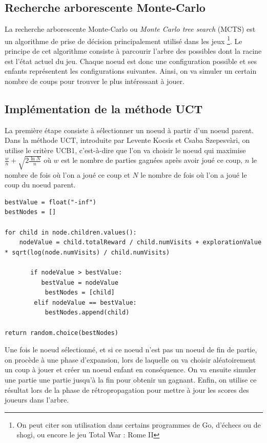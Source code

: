 \documentclass[a4paper]{article}
\theoremstyle{definition}
\begin{document}
\subsection{Recherche arborescente Monte-Carlo}

La recherche arborescente Monte-Carlo ou \textit{Monte Carlo tree search} (MCTS) est un algorithme de prise de décision principalement utilisé dans les jeux \footnote{On peut citer son utilisation dans certains programmes de Go, d'échecs ou de shogi, ou encore le jeu Total War : Rome II}. Le principe de cet algorithme consiste à parcourir l'arbre des possibles dont la racine est l'état actuel du jeu. Chaque noeud est donc une configuration possible et ses enfants représentent les configurations suivantes. Ainsi, on va simuler un certain nombre de coups pour trouver le plus intéressant à jouer.

\subsection{Implémentation de la méthode UCT}

La première étape consiste à sélectionner un noeud à partir d'un noeud parent. Dans la méthode UCT, introduite par Levente Kocsis et Csaba Szepesv\`ari, on utilise le critère UCB1, c'est-à-dire que l'on va choisir le noeud qui maximise $\frac{w}{n} + \sqrt{ 2\frac{\ln{N}}{n} }$ où $w$ est le nombre de parties gagnées après avoir joué ce coup, $n$ le nombre de fois où l'on a joué ce coup et $N$ le nombre de fois où l'on a joué le coup du noeud parent.

\begin{lstlisting}
bestValue = float("-inf")
bestNodes = []

for child in node.children.values():
	nodeValue = child.totalReward / child.numVisits + explorationValue * sqrt(log(node.numVisits) / child.numVisits)
	
       if nodeValue > bestValue:
       	  bestValue = nodeValue
           bestNodes = [child]
        elif nodeValue == bestValue:
           bestNodes.append(child)
             
return random.choice(bestNodes)
\end{lstlisting}

Une fois le noeud sélectionné, et si ce noeud n'est pas un noeud de fin de partie, on procède à une phase d'expansion, lors de laquelle on va choisir aléatoirement un coup à jouer et créer un noeud enfant en conséquence. On va ensuite simuler une partie 	une partie jusqu'à la fin pour obtenir un gagnant. Enfin, on utilise ce résultat lors de la phase de rétropropagation pour mettre à jour les scores des joueurs dans l'arbre. 
\end{document}
